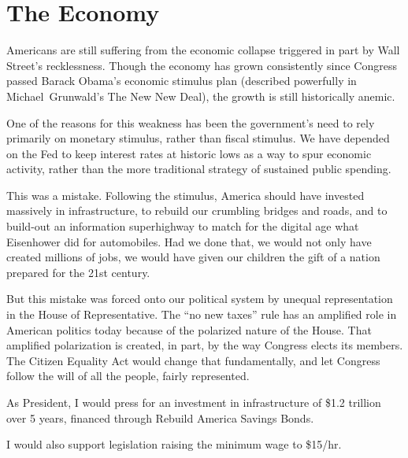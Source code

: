 \section{The Economy}
\label{sec:economy}

Americans are still suffering from the economic collapse triggered in part by Wall Street's recklessness. 
Though the economy has grown consistently since Congress passed Barack Obama's economic stimulus plan (described powerfully in Michael~Grunwald's The New New Deal), the growth is still historically anemic.

One of the reasons for this weakness has been the government's need to rely primarily on monetary stimulus, rather than fiscal stimulus. 
We have depended on the Fed to keep interest rates at historic lows as a way to spur economic activity, rather than the more traditional strategy of sustained public spending.

This was a mistake. 
Following the stimulus, America should have invested massively in infrastructure, to rebuild our crumbling bridges and roads, and to build-out an information superhighway to match for the digital age what Eisenhower did for automobiles. 
Had we done that, we would not only have created millions of jobs, we would have given our children the gift of a nation prepared for the 21st century.

But this mistake was forced onto our political system by unequal representation in the House of Representative. 
The ``no new taxes'' rule has an amplified role in American politics today because of the polarized nature of the House. 
That amplified polarization is created, in part, by the way Congress elects its members. 
The Citizen Equality Act would change that fundamentally, and let Congress follow the will of all the people, fairly represented.

As President, I would press for an investment in infrastructure of \$1.2 trillion over 5 years, financed through Rebuild America Savings Bonds.

I would also support legislation raising the minimum wage to \$15/hr.
